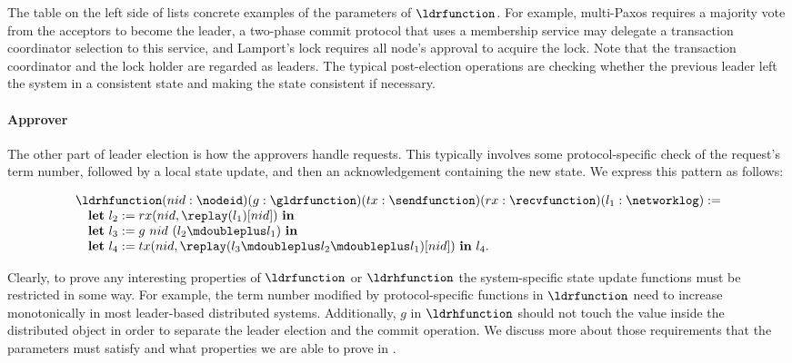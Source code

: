 The table on the left side of  lists concrete examples of the parameters of
$\ldrfunction$. For example, multi-Paxos requires a majority vote from the acceptors to
become the leader, a two-phase commit protocol that uses a membership service may delegate
a transaction coordinator selection to this service, and Lamport's lock requires all node's
approval to acquire the lock. Note that the transaction coordinator and the lock holder are
regarded as leaders. The typical post-election operations are checking whether the
previous leader left the system in a consistent state and making the state consistent
if necessary. 

\paragraph{Approver}
The other part of leader election is how the approvers handle requests.
This typically involves some protocol-specific check of the request's
term number, followed by a local state update, and then an acknowledgement
containing the new state. We express this pattern as follows:
\begin{small}
$$
\begin{array}{l}
	\ldrhfunction (nid: \nodeid) (g:  \gldrfunction)
	(tx: \sendfunction)(rx: \recvfunction)(l_1  :\networklog ) := \\
\ \ \ \mbox{\textbf{let}} \ l_2 := rx(nid, \replay(l_1)[nid]) \
  \mbox{\textbf{in}} \\
\ \ \ \mbox{\textbf{let}}\ l_3  := g\ nid \ (l_2 \mdoubleplus l_1) \ \mbox{\textbf{in}} \\
\ \ \ \mbox{\textbf{let}} \ l_4 :=  tx(nid, \replay(l_3 \mdoubleplus l_2 \mdoubleplus l_1)[nid]) \ \mbox{\textbf{in}} \ l_4.
   \\
\end{array}
$$
\end{small}

Clearly, to prove any interesting properties of $\ldrfunction$ or $\ldrhfunction$
the system-specific state update functions must be restricted in some way.
For example, the term number modified by protocol-specific functions in $\ldrfunction$
need to increase monotonically in most leader-based distributed systems.
Additionally, $g$ in $\ldrhfunction$ should not touch the value inside
the distributed object in order to separate the leader election and the commit operation.
We discuss more about those requirements that the parameters must satisfy and what properties we
are able to prove in \pref{sec:prove-safety-with-witness}.


